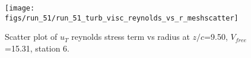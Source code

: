 \begin{figure}[H]
\centering
\texttt{[image: figs/run\_51/run\_51\_turb\_visc\_reynolds\_vs\_r\_meshscatter]}
\caption{Scatter plot of $
u_T$ reynolds stress term vs radius at $z/c$=9.50, $V_{free}$=15.31, station 6.}
\label{fig:run_51_turb_visc_reynolds_vs_r_meshscatter}
\end{figure}


